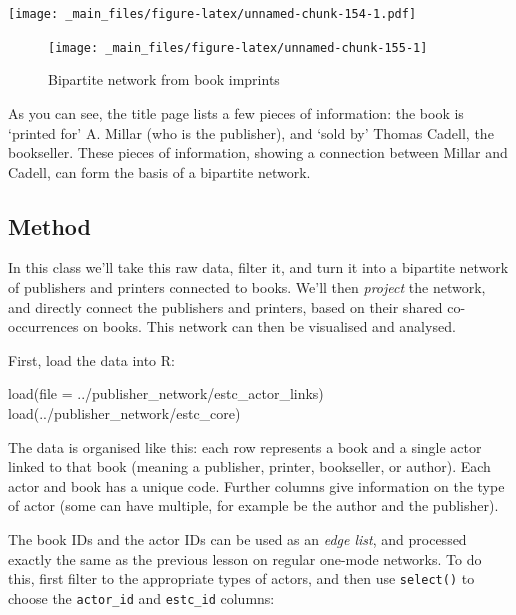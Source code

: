 \documentclass[
]{book}
\newenvironment{Shaded}{\begin{snugshade}}{\end{snugshade}}
\newcommand{\AttributeTok}[1]{\textcolor[rgb]{0.77,0.63,0.00}{#1}}
\newcommand{\FunctionTok}[1]{\textcolor[rgb]{0.00,0.00,0.00}{#1}}
\newcommand{\NormalTok}[1]{#1}
\newcommand{\StringTok}[1]{\textcolor[rgb]{0.31,0.60,0.02}{#1}}
\begin{document}
\texttt{[image: \_main\_files/figure-latex/unnamed-chunk-154-1.pdf]}

\begin{figure}
\texttt{[image: \_main\_files/figure-latex/unnamed-chunk-155-1]} \caption{Bipartite network from book imprints}\label{fig:unnamed-chunk-155}
\end{figure}

As you can see, the title page lists a few pieces of information: the book is `printed for' A. Millar (who is the publisher), and `sold by' Thomas Cadell, the bookseller. These pieces of information, showing a connection between Millar and Cadell, can form the basis of a bipartite network.

\hypertarget{method}{%
\subsection{Method}\label{method}}

In this class we'll take this raw data, filter it, and turn it into a bipartite network of publishers and printers connected to books. We'll then \emph{project} the network, and directly connect the publishers and printers, based on their shared co-occurrences on books. This network can then be visualised and analysed.

First, load the data into R:

\begin{Shaded}
\begin{Highlighting}[]
\FunctionTok{load}\NormalTok{(}\AttributeTok{file =} \StringTok{\textquotesingle{}../publisher\_network/estc\_actor\_links\textquotesingle{}}\NormalTok{)}
\FunctionTok{load}\NormalTok{(}\StringTok{\textquotesingle{}../publisher\_network/estc\_core\textquotesingle{}}\NormalTok{)}
\end{Highlighting}
\end{Shaded}

The data is organised like this: each row represents a book and a single actor linked to that book (meaning a publisher, printer, bookseller, or author). Each actor and book has a unique code. Further columns give information on the type of actor (some can have multiple, for example be the author and the publisher).

The book IDs and the actor IDs can be used as an \emph{edge list}, and processed exactly the same as the previous lesson on regular one-mode networks. To do this, first filter to the appropriate types of actors, and then use \texttt{select()} to choose the \texttt{actor\_id} and \texttt{estc\_id} columns:
\end{document}
